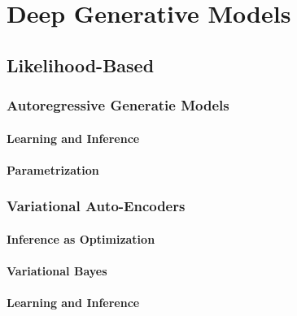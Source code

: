 \chapter{Deep Generative Models} %

    \section{Likelihood-Based} %

        \subsection{Autoregressive Generatie Models} %

            \subsubsection{Learning and Inference} %

            \subsubsection{Parametrization} %

        \subsection{Variational Auto-Encoders} %

            \subsubsection{Inference as Optimization} %

            \subsubsection{Variational Bayes} %

            \subsubsection{Learning and Inference} %

